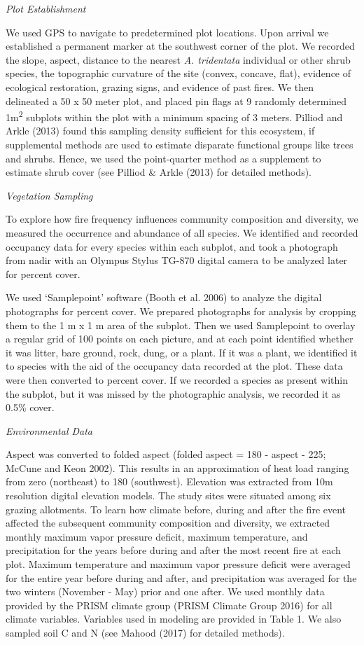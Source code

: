 \documentclass[12pt,]{article}
\begin{document}
\emph{Plot Establishment}

We used GPS to navigate to predetermined plot locations. Upon arrival we
established a permanent marker at the southwest corner of the plot. We
recorded the slope, aspect, distance to the nearest \emph{A. tridentata}
individual or other shrub species, the topographic curvature of the site
(convex, concave, flat), evidence of ecological restoration, grazing
signs, and evidence of past fires. We then delineated a 50 x 50 meter
plot, and placed pin flags at 9 randomly determined
1m\textsuperscript{2} subplots within the plot with a minimum spacing of
3 meters. Pilliod and Arkle (2013) found this sampling density
sufficient for this ecosystem, if supplemental methods are used to
estimate disparate functional groups like trees and shrubs. Hence, we
used the point-quarter method as a supplement to estimate shrub cover
(see Pilliod \& Arkle (2013) for detailed methods).

\emph{Vegetation Sampling}

To explore how fire frequency influences community composition and
diversity, we measured the occurrence and abundance of all species. We
identified and recorded occupancy data for every species within each
subplot, and took a photograph from nadir with an Olympus Stylus TG-870
digital camera to be analyzed later for percent cover.

We used `Samplepoint' software (Booth et al. 2006) to analyze the
digital photographs for percent cover. We prepared photographs for
analysis by cropping them to the 1 m x 1 m area of the subplot. Then we
used Samplepoint to overlay a regular grid of 100 points on each
picture, and at each point identified whether it was litter, bare
ground, rock, dung, or a plant. If it was a plant, we identified it to
species with the aid of the occupancy data recorded at the plot. These
data were then converted to percent cover. If we recorded a species as
present within the subplot, but it was missed by the photographic
analysis, we recorded it as 0.5\% cover.

\emph{Environmental Data}

Aspect was converted to folded aspect (folded aspect = \textbar{}180 -
\textbar{}aspect - 225\textbar{}\textbar{}; McCune and Keon 2002). This
results in an approximation of heat load ranging from zero (northeast)
to 180 (southwest). Elevation was extracted from 10m resolution digital
elevation models. The study sites were situated among six grazing
allotments. To learn how climate before, during and after the fire event
affected the subsequent community composition and diversity, we
extracted monthly maximum vapor pressure deficit, maximum temperature,
and precipitation for the years before during and after the most recent
fire at each plot. Maximum temperature and maximum vapor pressure
deficit were averaged for the entire year before during and after, and
precipitation was averaged for the two winters (November - May) prior
and one after. We used monthly data provided by the PRISM climate group
(PRISM Climate Group 2016) for all climate variables. Variables used in
modeling are provided in Table 1. We also sampled soil C and N (see
Mahood (2017) for detailed methods).
\end{document}
